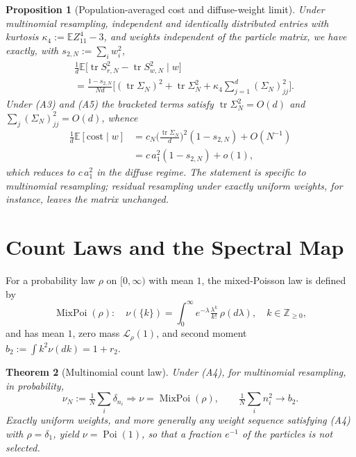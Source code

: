 \documentclass[lettersize,journal]{IEEEtran}
\newtheorem{theo}{Theorem}
\newtheorem{propprime}[theo]{Proposition}
\theoremstyle{remark}
\begin{document}
\begin{propprime}[Population-averaged cost and diffuse-weight limit]
\label{prop:popcost}
Under multinomial resampling, independent and identically distributed entries
with kurtosis $\kappa_4:=\mathbb{E}Z_{11}^4-3$, and weights independent of the
particle matrix, we have exactly, with $s_{2,N}:=\sum_iw_i^2$,
\begin{equation}
  \begin{aligned}
    &\tfrac{1}{d}\mathbb{E}\big[\operatorname{tr}S_{r,N}^2
      -\operatorname{tr}S_{w,N}^2 \mid w\big]\\
    &= \tfrac{1-s_{2,N}}{Nd}\Big[(\operatorname{tr}\Sigma_N)^2
      + \operatorname{tr}\Sigma_N^2
      + \kappa_4\textstyle\sum_{j=1}^d (\Sigma_N)_{jj}^2\Big].
  \end{aligned}
  \label{eq:popcost}
\end{equation}
Under (A3) and (A5) the bracketed terms satisfy
$\operatorname{tr}\Sigma_N^2=O(d)$ and $\sum_j(\Sigma_N)_{jj}^2=O(d)$, whence
\begin{align}
  \tfrac1d\mathbb{E}[\mathrm{cost}\mid w]
    &=c_N\big(\tfrac{\operatorname{tr}\Sigma_N}{d}\big)^2(1-s_{2,N})
      +O(N^{-1})\nonumber\\
    &=c\,a_1^2(1-s_{2,N})+o(1),
  \label{eq:popcost-asym}
\end{align}
which reduces to $c\,a_1^2$ in the diffuse regime. The statement is specific
to multinomial resampling; residual resampling under exactly uniform weights,
for instance, leaves the matrix unchanged.
\end{propprime}

\section{Count Laws and the Spectral Map}
\label{sec:count}

For a probability law $\rho$ on $[0,\infty)$ with mean $1$, the mixed-Poisson
law is defined by
\begin{equation}
  \operatorname{MixPoi}(\rho):\quad
  \nu(\{k\})=\int_0^\infty e^{-\lambda}\tfrac{\lambda^k}{k!}\,\rho(d\lambda),
  \quad k\in\mathbb{Z}_{\ge0},
  \label{eq:mixpoi}
\end{equation}
and has mean $1$, zero mass $\mathcal{L}_\rho(1)$, and second moment
$b_2:=\int k^2\nu(dk)=1+r_2$.

\begin{theo}[Multinomial count law]
\label{thm:multi-count}
Under (A4), for multinomial resampling, in probability,
\begin{equation}
  \nu_N:=\tfrac1N\sum_i\delta_{n_i}\Rightarrow\nu=\operatorname{MixPoi}(\rho),
  \qquad \tfrac1N\sum_in_i^2\to b_2.
  \label{eq:multi-count}
\end{equation}
Exactly uniform weights, and more generally any weight sequence satisfying
(A4) with $\rho=\delta_1$, yield $\nu=\operatorname{Poi}(1)$, so that a
fraction $e^{-1}$ of the particles is not selected.
\end{theo}
\end{document}
